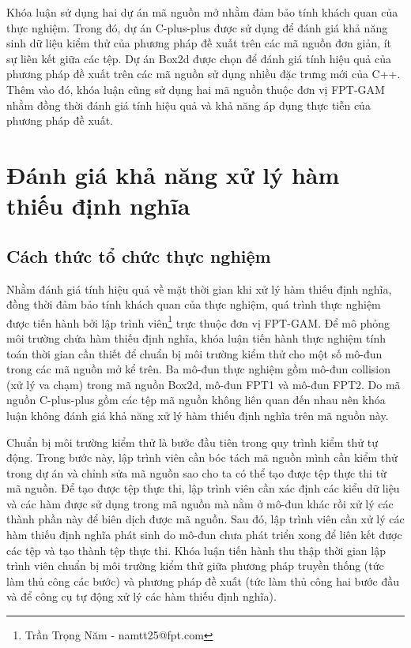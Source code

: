 Khóa luận sử dụng hai dự án mã nguồn mở nhằm đảm bảo tính khách quan của thực nghiệm. Trong đó, dự án C-plus-plus được sử dụng để đánh giá khả năng sinh dữ liệu kiểm thử của phương pháp đề xuất trên các mã nguồn đơn giản, ít sự liên kết giữa các tệp. Dự án Box2d được chọn để đánh giá tính hiệu quả của phương pháp đề xuất trên các mã nguồn sử dụng nhiều đặc trưng mới của C++. Thêm vào đó, khóa luận cũng sử dụng hai mã nguồn thuộc đơn vị FPT-GAM nhằm đồng thời đánh giá tính hiệu quả và khả năng áp dụng thực tiễn của phương pháp đề xuất.

\section{Đánh giá khả năng xử lý hàm thiếu định nghĩa}
\subsection{Cách thức tổ chức thực nghiệm}
Nhằm đánh giá tính hiệu quả về mặt thời gian khi xử lý hàm thiếu định nghĩa, đồng thời đảm bảo tính khách quan của thực nghiệm, quá trình thực nghiệm được tiến hành bởi lập trình viên\footnote{Trần Trọng Năm - namtt25@fpt.com} trực thuộc đơn vị FPT-GAM. Để mô phỏng môi trường chứa hàm thiếu định nghĩa, khóa luận tiến hành thực nghiệm tính toán thời gian cần thiết để chuẩn bị môi trường kiểm thử cho một số mô-đun trong các mã nguồn mở kể trên. Ba mô-đun thực nghiệm gồm mô-đun collision (xử lý va chạm) trong mã nguồn Box2d, mô-đun FPT1 và mô-đun FPT2. Do mã nguồn C-plus-plus gồm các tệp mã nguồn không liên quan đến nhau nên khóa luận không đánh giá khả năng xử lý hàm thiếu định nghĩa trên mã nguồn này.

Chuẩn bị môi trường kiểm thử là bước đầu tiên trong quy trình kiểm thử tự động. Trong bước này, lập trình viên cần bóc tách mã nguồn mình cần kiểm thử trong dự án và chỉnh sửa mã nguồn sao cho ta có thể tạo được tệp thực thi từ mã nguồn. Để tạo được tệp thực thi, lập trình viên cần xác định các kiểu dữ liệu và các hàm được sử dụng trong mã nguồn mà nằm ở mô-đun khác rồi xử lý các thành phần này để biên dịch được mã nguồn. Sau đó, lập trình viên cần xử lý các hàm thiếu định nghĩa phát sinh do mô-đun chưa phát triển xong để liên kết được các tệp và tạo thành tệp thực thi. Khóa luận tiến hành thu thập thời gian lập trình viên chuẩn bị môi trường kiểm thử giữa phương pháp truyền thống (tức làm thủ công các bước) và phương pháp đề xuất (tức làm thủ công hai bước đầu và để công cụ tự động xử lý các hàm thiếu định nghĩa).
